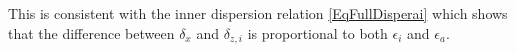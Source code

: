 \documentclass[a4paper,11pt]{article}
\begin{document}
This is consistent with the inner dispersion relation \ref{EqFullDisperai} which shows that the difference between $\delta_x$ and $\delta_{z,i}$ is proportional to both $\epsilon_i$ and $\epsilon_a$.


\end{document}
